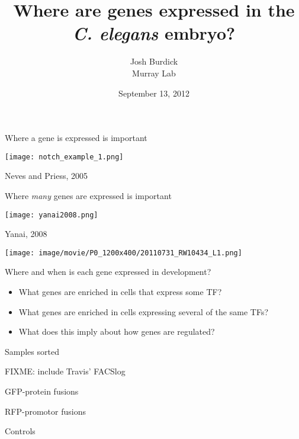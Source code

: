 \documentclass[serif,9pt]{beamer}
\title{Where are genes expressed in the {\em C. elegans} embryo?}
\author{Josh Burdick \\ Murray Lab}
\date{September 13, 2012}
\begin{document}
\begin{frame}
\titlepage
\end{frame}

\begin{frame}{Where a gene is expressed is important}

\begin{centering}
\texttt{[image: notch\_example\_1.png]}
\end{centering}

\hfill Neves and Priess, 2005

\end{frame}

\begin{frame}{Where {\em many} genes are expressed is important}

\texttt{[image: yanai2008.png]}

\hfill Yanai, 2008

\end{frame}

\begin{frame}

\texttt{[image: image/movie/P0\_1200x400/20110731\_RW10434\_L1.png]}

\end{frame}

\begin{frame}{Where and when is each gene expressed in development?}

\begin{itemize}

\item What genes are enriched in cells that express some TF?

\pause 

\item What genes are enriched in cells expressing several of the same TFs?

\pause

\item What does this imply about how genes are regulated?

\end{itemize}

\end{frame}

\begin{frame}{Samples sorted}

FIXME: include Travis' FACSlog

GFP-protein fusions

RFP-promotor fusions

Controls

\end{frame}
\end{document}
